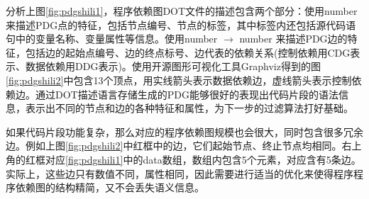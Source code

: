 

分析上图\ref{fig:pdgshili1}，程序依赖图DOT文件的描述包含两个部分：使用\textquotedbl number \textquotedbl [label =  <\(function,name\)> ]来描述PDG点的特征，包括节点编号、节点的标签，其中标签内还包括源代码语句中的变量名称、变量属性等信息。使用\textquotedbl number \textquotedbl $\to$ \textquotedbl number \textquotedbl [label = \textquotedbl CDG/DDG:data \textquotedbl ]来描述PDG边的特征，包括边的起始点编号、边的终点标号、边代表的依赖关系(控制依赖用CDG表示、数据依赖用DDG表示)。使用开源图形可视化工具Graphviz得到的图\ref{fig:pdgshili2}中包含13个顶点，用实线箭头表示数据依赖边，虚线箭头表示控制依赖边。通过DOT描述语言存储生成的PDG能够很好的表现出代码片段的语法信息，表示出不同的节点和边的各种特征和属性，为下一步的过滤算法打好基础。

如果代码片段功能复杂，那么对应的程序依赖图规模也会很大，同时包含很多冗余边。例如上图\ref{fig:pdgshili2}中红框中的边，它们起始节点、终止节点均相同。右上角的红框对应\ref{fig:pdgshili1}中的data数组，数组内包含5个元素，对应含有5条边。实际上，这些边只有数值不同，属性相同，因此需要进行适当的优化来使得程序程序依赖图的结构精简，又不会丢失语义信息。

